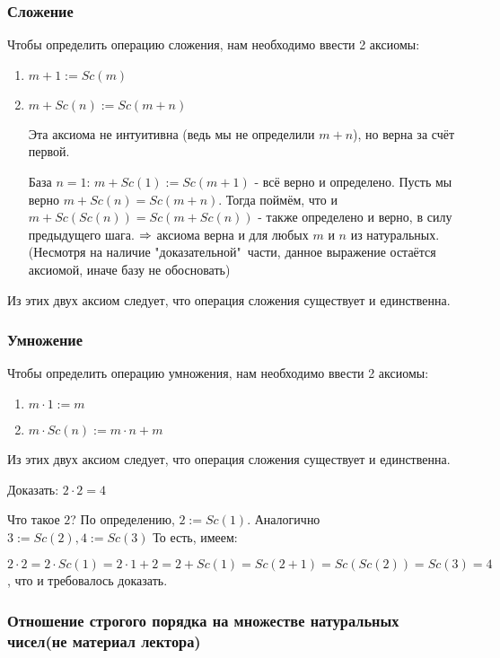 \subsubsection*{Сложение}

Чтобы определить операцию сложения, нам необходимо ввести 2 аксиомы:
\begin{enumerate}
    \item $m + 1 := Sc(m)$
    \item $m + Sc(n) := Sc(m + n)$
    \begin{note}
        Эта аксиома не интуитивна (ведь мы не определили $m + n$), но верна за счёт первой.
        
        База $n = 1$: $m + Sc(1) := Sc(m + 1)$ - всё верно и определено.
        Пусть мы верно $m + Sc(n) = Sc(m + n)$. Тогда поймём, что и
        $m + Sc(Sc(n)) = Sc(m + Sc(n))$ - также определено и верно, в силу предыдущего шага.
        $\Rightarrow$ аксиома верна и для любых $m$ и $n$ из натуральных. (Несмотря на наличие "доказательной"\ части, данное выражение остаётся аксиомой, иначе базу не обосновать)
    \end{note}
\end{enumerate}

Из этих двух аксиом следует, что операция сложения существует и единственна.

\subsubsection*{Умножение}

Чтобы определить операцию умножения, нам необходимо ввести 2 аксиомы:
\begin{enumerate}
    \item $m \cdot 1 := m$
    \item $m \cdot Sc(n) := m \cdot n + m$
\end{enumerate}

Из этих двух аксиом следует, что операция сложения существует и единственна.

\begin{example}
    Доказать: $2 \cdot 2 = 4$
    
    Что такое $2$? По определению, $2 := Sc(1)$. Аналогично $3 := Sc(2), 4 := Sc(3)$
    То есть, имеем:
    
    $2 \cdot 2 = 2 \cdot Sc(1) = 2 \cdot 1 + 2 = 2 + Sc(1) = Sc(2 + 1) = Sc(Sc(2)) = Sc(3) = 4$, что и требовалось доказать.
\end{example}

\subsubsection*{Отношение строгого порядка на множестве натуральных чисел(не материал лектора)}

